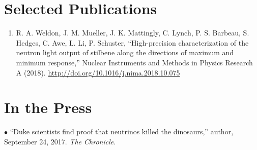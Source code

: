 \documentclass[overlapped,line,letterpaper]{res}
\begin{document}
\begin{resume}
\begin{enumerate}
\end{enumerate}


\section{\textbf{\normalsize Selected Publications}}
\begin{enumerate}
	\item R. A. Weldon, J. M. Mueller, J. K. Mattingly, C. Lynch, P. S. Barbeau, S. Hedges, C. Awe, L. Li, P. Schuster, ``High-precision characterization of the neutron light output of stilbene along the directions of maximum and minimum response,'' Nuclear Instruments and Methods in Physics Research A (2018). \url{http://doi.org/10.1016/j.nima.2018.10.075}

	
\end{enumerate}

%
\section{\textbf{In the Press}}

	$\bullet$ ``Duke scientists find proof that neutrinos killed the dinosaurs,'' author, September 24, 2017. \emph{The Chronicle}. %
%


%




\begin{center}
\end{center}

\end{resume}
\end{document}
